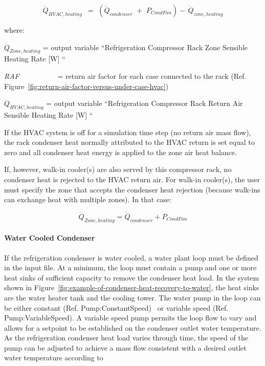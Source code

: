 \begin{equation}
{\dot Q_{HVAC,heating}}\,\,\, = \,\,\left( {{{\dot Q}_{condenser}}\,\, + \,\,{P_{CondFan}}} \right) - \,{\dot Q_{zone,heating}}
\end{equation}

where:

\({\dot Q_{Zone,heating}}\) = output variable ``Refrigeration Compressor Rack Zone Sensible Heating Rate {[}W{]} ``

\emph{RAF}~~~~~~~~~~ = return air factor for each case connected to the rack (Ref. Figure~\ref{fig:return-air-factor-versus-under-case-hvac})

\({\dot Q_{HVAC,heating}}\) = output variable ``Refrigeration Compressor Rack Return Air Sensible Heating Rate {[}W{]} ``

If the HVAC system is off for a simulation time step (no return air mass flow), the rack condenser heat normally attributed to the HVAC return is set equal to zero and all condenser heat energy is applied to the zone air heat balance.

If, however, walk-in cooler(s) are also served by this compressor rack, no condenser heat is rejected to the HVAC return air. For walk-in cooler(s), the user must specify the zone that accepts the condenser heat rejection (because walk-ins can exchange heat with multiple zones). In that case:

\begin{equation}
{\dot Q_{Zone,heating}} = {\dot Q_{condenser}} + {P_{CondFan}}
\end{equation}

\paragraph{Water Cooled Condenser}\label{water-cooled-condenser}

If the refrigeration condenser is water cooled, a water plant loop must be defined in the input file. At a minimum, the loop must contain a pump and one or more heat sinks of sufficient capacity to remove the condenser heat load. In the system shown in Figure~\ref{fig:example-of-condenser-heat-recovery-to-water}, the heat sinks are the water heater tank and the cooling tower. The water pump in the loop can be either constant (Ref. Pump:ConstantSpeed)~ or variable speed (Ref. Pump:VariableSpeed). A variable speed pump permits the loop flow to vary and allows for a setpoint to be established on the condenser outlet water temperature. As the refrigeration condenser heat load varies through time, the speed of the pump can be adjusted to achieve a mass flow consistent with a desired outlet water temperature according to

